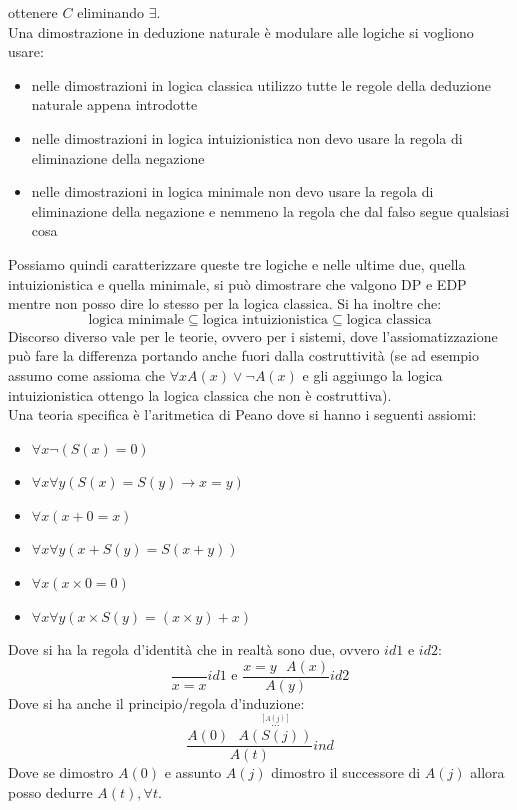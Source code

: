 \documentclass[a4paper,12pt, oneside]{book}
\begin{document}
ottenere $C$ eliminando $\exists$.\\
Una dimostrazione in deduzione naturale è modulare alle logiche si vogliono
usare:
\begin{itemize}
  \item nelle dimostrazioni in logica classica utilizzo tutte le regole della
  deduzione naturale appena introdotte
  \item nelle dimostrazioni in logica intuizionistica non devo usare la regola
  di eliminazione della negazione
  \item  nelle dimostrazioni in logica minimale non devo usare la regola
  di eliminazione della negazione e nemmeno la regola che dal falso segue
  qualsiasi cosa
\end{itemize}
Possiamo quindi caratterizzare queste tre logiche e nelle ultime due, quella
intuizionistica e quella minimale, si può dimostrare che valgono DP e EDP mentre
non posso dire lo 
stesso per la logica classica. Si ha inoltre che:
\[\mbox{logica minimale}\subseteq\mbox{logica
    intuizionistica}\subseteq\mbox{logica classica}\]
Discorso diverso vale per le teorie, ovvero per i sistemi, dove
l'assiomatizzazione può fare la differenza portando anche fuori dalla
costruttività (se ad esempio assumo come assioma che $\forall xA(x)\lor\neg
A(x)$ e gli aggiungo la logica intuizionistica ottengo la logica classica che
non è costruttiva).\\
Una teoria specifica è l'aritmetica di Peano dove si hanno i seguenti assiomi:
\begin{itemize}
  \item $\forall x\neg(S(x)=0)$
  \item $\forall x\forall y(S(x)=S(y)\to x=y)$
  \item $\forall x(x+0=x)$
  \item $\forall x\forall y(x+S(y)=S(x+y))$
  \item $\forall x(x\times 0 =0)$
  \item $\forall x\forall y(x\times S(y)=(x\times y)+x)$
\end{itemize}
Dove si ha la regola d'identità che in realtà sono due, ovvero $id1$ e $id2$:
\[\frac{}{x=x}id1\mbox{ e } \frac{x=y\,\,\,\,A(x)}{A(y)}id2\]
Dove si ha anche il principio/regola d'induzione:
\[\frac{A(0)\,\,\,\,\stackrel{\stackrel{[A(j)]}{\cdots}}{A(S(j))}}{A(t)}ind\]
Dove se dimostro $A(0)$ e assunto $A(j)$ dimostro il successore di $A(j)$ allora
posso dedurre $A(t),\forall t$.
\end{document}
